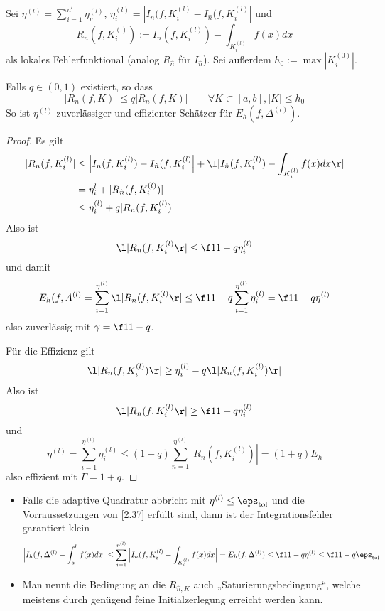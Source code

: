 \documentclass[11pt]{scrbook}
\begin{document}
\begin{st}
	\label{2.37}
	Sei $\eta^{(l)} = \sum_{i=1}^{n^{l}} \eta_v^{(l)}$, $\eta_i^{(l)} = | I_n(f, K_i^{(l)} - I_{\hat n}(f, K_i^{(l)}|$ und
	\[
		R_n (f, K_i^{()}) := I_n(f,K_i^{(l)}) - \int_{K_i^{(l)}} f(x) dx
	\]
	als lokales Fehlerfunktional (analog $R_{\hat n}$ für $I_{\hat n}$).
	Sei außerdem $h_0 := \max |K_i^{(0)}|$.

	Falls $q \in (0,1)$ existiert, so dass
	\[
		| R_{\hat n}(f,K)| \le q |R_n(f,K)|
		\qquad \forall K\subset [a,b], |K| \le h_0
	\]
	So ist $\eta^{(l)}$ zuverlässiger und effizienter Schätzer für $E_h(f,\Delta^{(l)})$.
	\begin{proof}
		Es gilt
		\begin{align*}
			|R_n(f,K_i^{(l)}|
			&\le \Big|I_n(f,K_i^{(l)}) - I_{\hat n}(f,K_i^{(l)} \Big| + \l|I_{\hat n}(f,K_i^{(l)}) - \int_{K_i^{(l)}}f(x) dx \r| \\
			&= \eta_i^{l} + |R_{\hat n}(f,K_i^{(l)}) | \\
			&\le \eta_i^{(l)} + q |R_n(f,K_i^{(l)})|
		\end{align*}
		Also ist
		\[
			\l|R_n(f,K_i^{(l)}\r| \le \f 1{1-q} \eta_i^{(l)}
		\]
		und damit
		\begin{align*}
			E_h(f, A^{(l)} = \sum_{i=1}^{\eta^{(l)}} \l|R_n(f, K_i^{(l)} \r| \le \f 1{1-q} \sum_{i=1}^{\eta^{(l)}} \eta_i^{(l)} = \f 1{1-q} \eta^{(l)}
		\end{align*}
		also zuverlässig mit $\gamma = \f 1{1-q}$.

		Für die Effizienz gilt
		\begin{align*}
			\l|R_n(f, K_i^{(l)}) \r| 
			&\ge \eta_i^{(l)} - q \l| R_n(f, K_i^{(l)}) \r| \\
		\end{align*}
		Also ist
		\[
			\l|R_n(f, K_i^{(l)}\r| \ge \f 1{1+q} \eta_i^{(l)}
		\]
		und
		\[
			\eta^{(l)} = \sum_{i=1}^{\eta^{(l)}}{\eta_i^{(l)}} \le (1+q) \sum_{n=1}^{\eta^{(l)}} | R_n(f, K_i^{(l)}) | = (1+q) E_h
		\]
		also effizient mit $\Gamma = 1+q$.
	\end{proof}
	\begin{note}
		\begin{itemize}
			\item
				Falls die adaptive Quadratur abbricht mit $\eta^{(l)} \le \eps_{\text{tol}}$ und die Vorraussetzungen von \ref{2.37} erfüllt sind, dann ist der Integrationsfehler garantiert klein
				\[
					\Big| I_h(f,\Delta^{(l)} - \int_a^b f(x) dx \big|
					\le \sum_{i=1}^{\eta^{(l)}} \Big| I_n(f,K_i^{(l)} - \int_{K_i^{(l)}} f(x) dx \Big|
					= E_h(f,\Delta^{(l)})
					\le \f 1{1-q} \eta^{(l)}
					\le \f 1{1-q} \eps_{\text{tol}}
				\]
			\item
				Man nennt die Bedingung an die $R_{\hat n, K}$ auch „Saturierungsbedingung“, welche meistens durch genügend feine Initialzerlegung erreicht werden kann.


\end{itemize}
\end{note}
\end{st}
\end{document}
